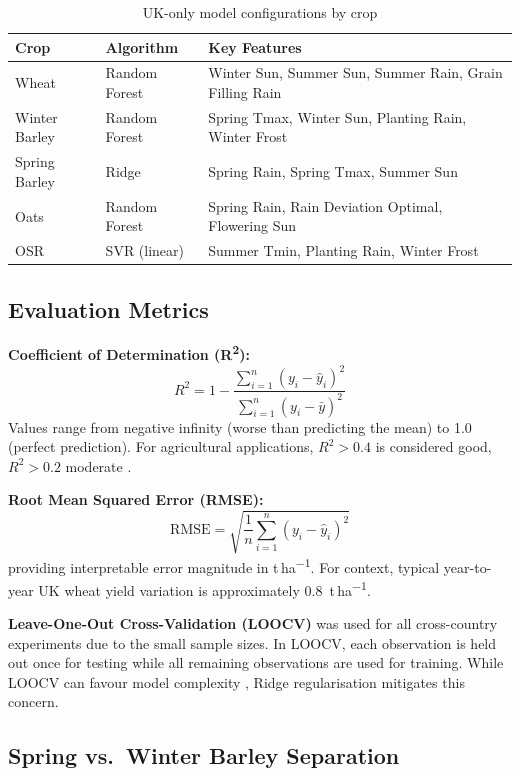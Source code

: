 \documentclass[12pt,a4paper]{report}
\newcommand{\rsq}{R\textsuperscript{2}}
\newcommand{\tha}{t\,ha\textsuperscript{$-1$}}
\begin{document}
\begin{table}[H]
\centering
\caption{UK-only model configurations by crop}
\label{tab:uk_model_configs}
\begin{tabular}{lll}
\toprule
\textbf{Crop} & \textbf{Algorithm} & \textbf{Key Features} \\
\midrule
Wheat & Random Forest & Winter Sun, Summer Sun, Summer Rain, Grain Filling Rain \\
Winter Barley & Random Forest & Spring Tmax, Winter Sun, Planting Rain, Winter Frost \\
Spring Barley & Ridge & Spring Rain, Spring Tmax, Summer Sun \\
Oats & Random Forest & Spring Rain, Rain Deviation Optimal, Flowering Sun \\
OSR & SVR (linear) & Summer Tmin, Planting Rain, Winter Frost \\
\bottomrule
\end{tabular}
\end{table}

\subsection{Evaluation Metrics}

\textbf{Coefficient of Determination (\rsq{}):}
\begin{equation}
    R^2 = 1 - \frac{\sum_{i=1}^{n}(y_i - \hat{y}_i)^2}{\sum_{i=1}^{n}(y_i - \bar{y})^2}
\end{equation}
Values range from negative infinity (worse than predicting the mean) to 1.0 (perfect prediction). For agricultural applications, $R^2 > 0.4$ is considered good, $R^2 > 0.2$ moderate \citep{lobell2010}.

\textbf{Root Mean Squared Error (RMSE):}
\begin{equation}
    \text{RMSE} = \sqrt{\frac{1}{n}\sum_{i=1}^{n}(y_i - \hat{y}_i)^2}
\end{equation}
providing interpretable error magnitude in \tha{}. For context, typical year-to-year UK wheat yield variation is approximately 0.8~\tha{}.

\textbf{Leave-One-Out Cross-Validation (LOOCV)} was used for all cross-country experiments due to the small sample sizes. In LOOCV, each observation is held out once for testing while all remaining observations are used for training. While LOOCV can favour model complexity \citep{dinh2022}, Ridge regularisation mitigates this concern.

\subsection{Spring vs.\ Winter Barley Separation}
\end{document}
